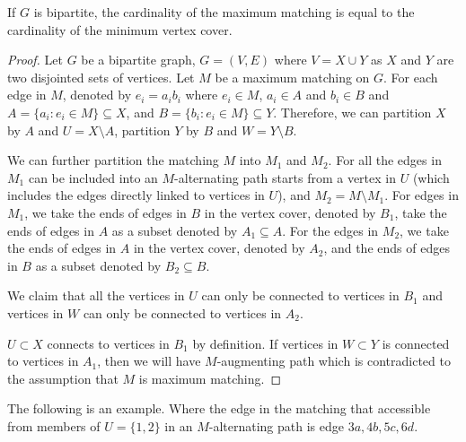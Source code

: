 			\begin{theorem}
				If $G$ is bipartite, the cardinality of the maximum matching is equal to the cardinality of the minimum vertex cover.
			\end{theorem}

			\begin{proof}
				Let $G$ be a bipartite graph, $G = (V, E)$ where $V = X\cup Y$ as $X$ and $Y$ are two disjointed sets of vertices. Let $M$ be a maximum matching on $G$. For each edge in $M$, denoted by $e_i = a_ib_i$ where $e_i \in M$, $a_i \in A$ and $b_i \in B$ and $A = \{a_i: e_i \in M\} \subseteq X$, and $B = \{b_i: e_i \in M\} \subseteq Y$. Therefore, we can partition $X$ by $A$ and $U = X\setminus A$, partition $Y$ by $B$ and $W = Y\setminus B$.

				We can further partition the matching $M$ into $M_1$ and $M_2$. For all the edges in $M_1$ can be included into an $M$-alternating path starts from a vertex in $U$ (which includes the edges directly linked to vertices in $U$), and $M_2 = M \setminus M_1$. For edges in $M_1$, we take the ends of edges in $B$ in the vertex cover, denoted by $B_1$, take the ends of edges in $A$ as a subset denoted by $A_1 \subseteq A$. For the edges in $M_2$, we take the ends of edges in $A$ in the vertex cover, denoted by $A_2$, and the ends of edges in $B$ as a subset denoted by $B_2 \subseteq B$. 

				We claim that all the vertices in $U$ can only be connected to vertices in $B_1$ and vertices in $W$ can only be connected to vertices in $A_2$.

				$U \subset X$ connects to vertices in $B_1$ by definition. If vertices in $W \subset Y$ is connected to vertices in $A_1$, then we will have $M$-augmenting path which is contradicted to the assumption that $M$ is maximum matching.
			\end{proof}

			The following is an example. Where the edge in the matching that accessible from members of $U = \{1, 2\}$ in an $M$-alternating path is edge $3a, 4b, 5c, 6d$.

